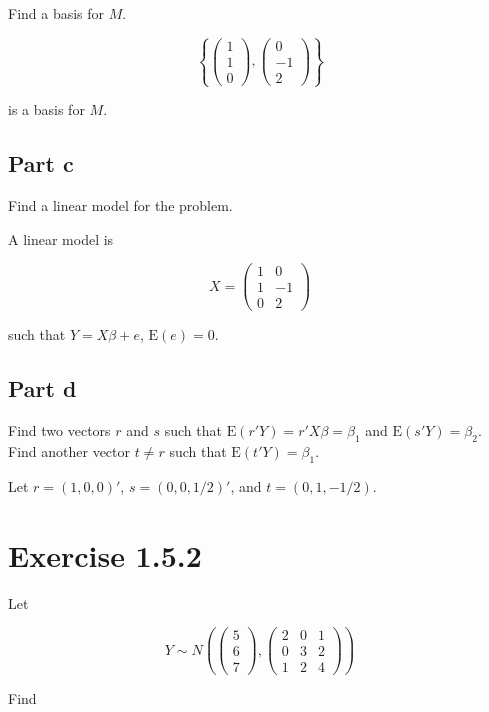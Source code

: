 \documentclass{article}
\newcommand{\E}{\text{E}}
\begin{document}
Find a basis for $M$.

\[
\left\{
\begin{pmatrix}
1\\1\\0
\end{pmatrix},
\begin{pmatrix}
0\\-1\\2
\end{pmatrix}
\right\}
\]

is a basis for $M$.

\subsection*{Part c}

Find a linear model for the problem.

A linear model is

\[
X = \begin{pmatrix}
1 & 0 \\
1 & -1 \\
0 & 2
\end{pmatrix}
\]

such that $Y = X\beta + e$, $\E(e)=0$.

\subsection*{Part d}

Find two vectors $r$ and $s$ such that $\E(r'Y) = r'X\beta = \beta_1$ and $\E(s'Y) =\beta_2$. Find another vector $t \neq r$ such that $\E(t'Y)=\beta_1$.

Let $r = (1, 0, 0)'$, $s = (0, 0, 1/2)'$, and $t=(0, 1, -1/2)$.

\section*{Exercise 1.5.2}

Let

\[
Y \sim N\left(
\begin{pmatrix}
5 \\ 6 \\ 7
\end{pmatrix},
\begin{pmatrix}
2 & 0 & 1 \\
0 & 3 & 2 \\
1 & 2 & 4
\end{pmatrix}
\right)
\]

Find
\end{document}
